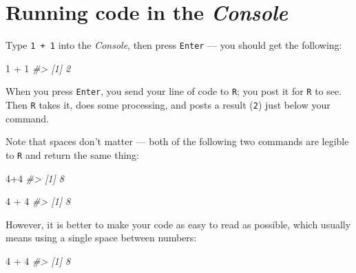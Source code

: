 \documentclass[
]{book}
\newenvironment{Shaded}{\begin{snugshade}}{\end{snugshade}}
\newcommand{\CommentTok}[1]{\textcolor[rgb]{0.56,0.35,0.01}{\textit{#1}}}
\newcommand{\DecValTok}[1]{\textcolor[rgb]{0.00,0.00,0.81}{#1}}
\newcommand{\SpecialCharTok}[1]{\textcolor[rgb]{0.00,0.00,0.00}{#1}}
\begin{document}
\hypertarget{running-code-in-the-console}{%
\section*{\texorpdfstring{Running code in the \emph{Console}}{Running code in the Console}}\label{running-code-in-the-console}}

Type \texttt{1\ +\ 1} into the \emph{Console}, then press \texttt{Enter} --- you should get the following:

\begin{Shaded}
\begin{Highlighting}[]
\DecValTok{1} \SpecialCharTok{+} \DecValTok{1}
\CommentTok{\#\textgreater{} [1] 2}
\end{Highlighting}
\end{Shaded}

When you press \texttt{Enter}, you send your line of code to \texttt{R}; you post it for \texttt{R} to see. Then \texttt{R} takes it, does some processing, and posts a result (\texttt{2}) just below your command.

Note that spaces don't matter --- both of the following two commands are legible to \texttt{R} and return the same thing:

\begin{Shaded}
\begin{Highlighting}[]
\DecValTok{4}\SpecialCharTok{+}\DecValTok{4}
\CommentTok{\#\textgreater{} [1] 8}
\end{Highlighting}
\end{Shaded}

\begin{Shaded}
\begin{Highlighting}[]
\DecValTok{4}        \SpecialCharTok{+}        \DecValTok{4}
\CommentTok{\#\textgreater{} [1] 8}
\end{Highlighting}
\end{Shaded}

However, it is better to make your code as easy to read as possible, which usually means using a single space between numbers:

\begin{Shaded}
\begin{Highlighting}[]
\DecValTok{4} \SpecialCharTok{+} \DecValTok{4}
\CommentTok{\#\textgreater{} [1] 8}
\end{Highlighting}
\end{Shaded}
\end{document}
